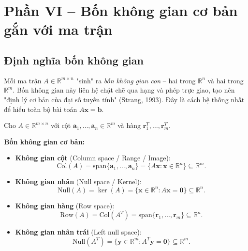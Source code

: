 \documentclass[12pt,a4paper]{article}
\begin{document}
\newpage

\section{Phần VI -- Bốn không gian cơ bản gắn với ma trận}

\subsection{Định nghĩa bốn không gian}

\begin{dongco}
Mỗi ma trận $A \in \mathbb{R}^{m\times n}$ "sinh" ra \emph{bốn không gian con} -- hai trong $\mathbb{R}^n$ và hai trong $\mathbb{R}^m$. Bốn không gian này liên hệ chặt chẽ qua hạng và phép trực giao, tạo nên "định lý cơ bản của đại số tuyến tính" (Strang, 1993). Đây là cách hệ thống nhất để hiểu toàn bộ bài toán $A\mathbf{x} = \mathbf{b}$.
\end{dongco}

\begin{dinhnghia}
  Cho $A \in \mathbb{R}^{m\times n}$ với cột $\mathbf{a}_1, \ldots, \mathbf{a}_n \in \mathbb{R}^m$ và hàng $\mathbf{r}_1^T, \ldots, \mathbf{r}_m^T$.

  \textbf{Bốn không gian cơ bản:}
  \begin{itemize}
    \item \textbf{Không gian cột} (Column space / Range / Image):
    \[
      \mathrm{Col}(A) = \mathrm{span}\{\mathbf{a}_1, \ldots, \mathbf{a}_n\} = \{A\mathbf{x} : \mathbf{x} \in \mathbb{R}^n\} \subseteq \mathbb{R}^m.
    \]
    \item \textbf{Không gian nhân} (Null space / Kernel):
    \[
      \mathrm{Null}(A) = \ker(A) = \{\mathbf{x} \in \mathbb{R}^n : A\mathbf{x} = \mathbf{0}\} \subseteq \mathbb{R}^n.
    \]
    \item \textbf{Không gian hàng} (Row space):
    \[
      \mathrm{Row}(A) = \mathrm{Col}(A^T) = \mathrm{span}\{\mathbf{r}_1, \ldots, \mathbf{r}_m\} \subseteq \mathbb{R}^n.
    \]
    \item \textbf{Không gian nhân trái} (Left null space):
    \[
      \mathrm{Null}(A^T) = \{\mathbf{y} \in \mathbb{R}^m : A^T\mathbf{y} = \mathbf{0}\} \subseteq \mathbb{R}^m.
    \]
  \end{itemize}
\end{dinhnghia}
\end{document}
